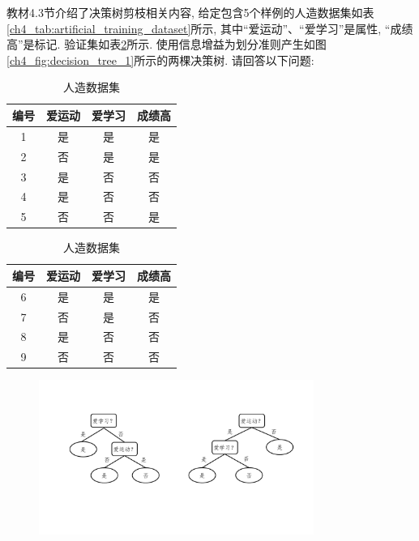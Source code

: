 \documentclass[answers]{exam}  %
\begin{document}
\begin{questions}
  教材4.3节介绍了决策树剪枝相关内容, 给定包含5个样例的人造数据集如表\ref{ch4_tab:artificial_training_dataset}所示, 其中“爱运动”、“爱学习”是属性, “成绩高”是标记. 验证集如表\ref{ch4_tab:artificial_testing_dataset}所示. 使用信息增益为划分准则产生如图\ref{ch4_fig:decision_tree_1}所示的两棵决策树. 请回答以下问题:
  \begin{table}[!htb]
    \caption{人造数据集}
    \begin{minipage}[t]{.48\linewidth}
      \label{ch4_tab:artificial_training_dataset}
      \centering
      \begin{tabular}{cccc}
        \hline 编号 & 爱运动 & 爱学习 & 成绩高 \\
        \hline 1    & 是     & 是     & 是     \\
        2           & 否     & 是     & 是     \\
        3           & 是     & 否     & 否     \\
        4           & 是     & 否     & 否     \\
        5           & 否     & 否     & 是     \\
        \hline
      \end{tabular}
    \end{minipage}%
    \begin{minipage}[t]{.48\linewidth}
      \centering
      \label{ch4_tab:artificial_testing_dataset}
      \begin{tabular}{cccc}
        \hline 编号 & 爱运动 & 爱学习 & 成绩高 \\
        \hline 6    & 是     & 是     & 是     \\
        7           & 否     & 是     & 否     \\
        8           & 是     & 否     & 否     \\
        9           & 否     & 否     & 否     \\
        \hline
      \end{tabular}
    \end{minipage}
  \end{table}
  \begin{figure}[ht]
    \centering
    \includegraphics[width=0.8\textwidth]{figure/ch4_decision_tree_1.pdf}

\end{figure}
\end{questions}
\end{document}

